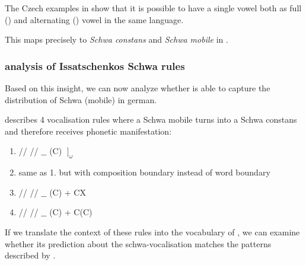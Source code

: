 The Czech examples in  show that it is possible
to have a single vowel both as full () and alternating ()
vowel in the same language.

This maps precisely to \emph{Schwa constans} and \emph{Schwa mobile} in
\textcite{issatschenko1974}.

\subsubsection{\CVCV analysis of Issatschenkos Schwa rules}
Based on this insight, we can now analyze whether \CVCV is able to capture
the distribution of Schwa (mobile) in german.



\citeauthor{issatschenko1974} describes 4 vocalisation rules where
a Schwa mobile turns into a Schwa constans and therefore receives
phonetic manifestation:

\begin{enumerate}
  \item \deriv
    {/\schwaMobi/}    %
    {/\schwaCons/}    %
    {$\_\_$ (C) $\;\big]_\omega$}
  \item same as 1. but with composition boundary instead of word boundary
  \item \deriv
    {/\schwaMobi/}    %
    {/\schwaCons/}    %
    {$\_\_$ (C) + CX}
  \item \deriv
    {/\schwaMobi/}    %
    {/\schwaCons/}    %
    {$\_\_$ (C) + \schwaMobi C(C)}
\end{enumerate}

If we translate the context of these rules into the
vocabulary of \CVCV, we can examine whether its prediction
about the schwa-vocalisation matches the patterns
described by \citeauthor{issatschenko1974}.

